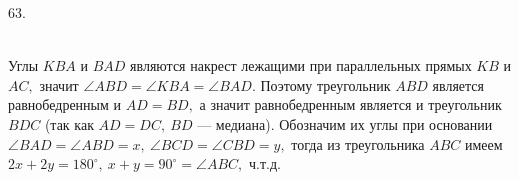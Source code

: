 63. \begin{figure}[ht!]
\end{figure}\\
Углы $KBA$ и $BAD$ являются накрест лежащими при параллельных прямых $KB$ и $AC,$ значит $\angle ABD=\angle KBA=\angle BAD.$ Поэтому треугольник $ABD$ является равнобедренным и $AD=BD,$ а значит равнобедренным является и треугольник $BDC$ (так как $AD=DC,\ BD$ --- медиана). Обозначим их углы при основании $\angle BAD=\angle ABD=x,\ \angle BCD=\angle CBD=y,$ тогда из треугольника $ABC$ имеем $2x+2y=180^\circ,\ x+y=90^\circ=\angle ABC,$ ч.т.д.\\
